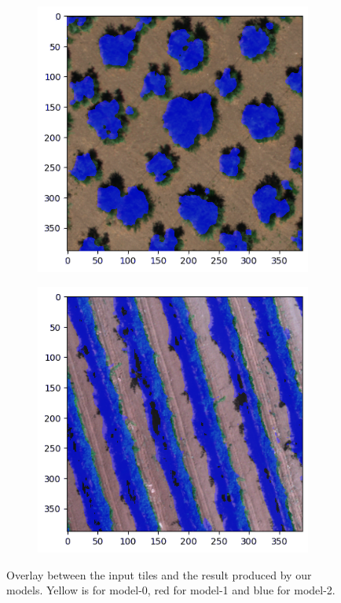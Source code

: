 \documentclass[comsoc,final]{IEEEtran}
\begin{document}
\begin{figure}
\begin{subfigure}[b]{0.47\columnwidth}
     \end{subfigure}
%
      \begin{subfigure}[b]{0.47\columnwidth}
         \centering \includegraphics[width=\columnwidth]{ULIVO2INF}
     \end{subfigure}%
%       
      \begin{subfigure}[b]{0.47\columnwidth}
         \centering \includegraphics[width=\columnwidth]{VITE2INF}
     \end{subfigure}%
     \caption{Overlay between the input tiles and the result produced by our models. Yellow is for model-0, red for model-1 and blue for model-2.}
     \label{fig:unet_models}
\end{figure}
\end{document}

